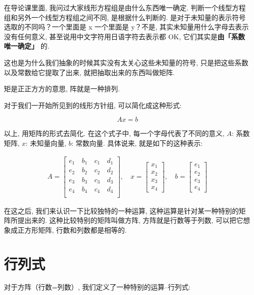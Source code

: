 在导论课里面, 我问过大家线形方程组是由什么东西唯一确定. 判断一个线型方程组和另外一个线型方程组之间不同, 是根据什么判断的. 是对于未知量的表示符号选取的不同吗？一个里面是 x 一个里面是 y？不是, 其实未知量用什么字母去表示没有任何意义, 甚至说用中文字符用日语字符去表示都 OK, 它们其实是\textbf{由「系数唯一确定」} 的. 

这也是为什么我们抽象的时候其实没有太关心这些未知量的符号, 只是把这些系数以及常数给它提取了出来, 就把抽取出来的东西叫做矩阵. 

矩是正正方方的意思, 阵就是一种排列. 

对于我们一开始所见到的线形方针组, 可以简化成这种形式:

\[
  Ax = b
\]

以上, 用矩阵的形式去简化. 在这个式子中, 每一个字母代表了不同的意义, $A$: 系数矩阵, $x$: 未知量向量, $b$: 常数向量. 具体说来, 就是如下的这种表示: 


\begin{align*}
  A = 
  \begin{bmatrix}
  e_1 \quad b_1 \quad c_1 \quad  d_1\\
  e_2 \quad b_2 \quad c_2 \quad  d_2\\ 
  e_3 \quad b_3 \quad c_3 \quad  d_3\\
  e_4 \quad b_4 \quad c_4 \quad  d_4\\
  \end{bmatrix}, \quad
  x = 
  \begin{bmatrix}
  x_1 \\
  x_2 \\
  x_3 \\
  x_4
  \end{bmatrix}, \quad
  b = 
  \begin{bmatrix}
  e_1 \\
  e_2 \\
  e_3 \\
  e_4
  \end{bmatrix}
\end{align*}


在这之后, 我们来认识一下比较独特的一种运算, 这种运算是针对某一种特别的矩阵所提出来的. 这种比较特别的矩阵叫做方阵, 方阵就是行数等于列数, 可以把它想象成正方形矩阵, 行数和列数都是相等的. 

\section{行列式}

对于方阵（行数=列数）, 我们定义了一种特别的运算--行列式: 

